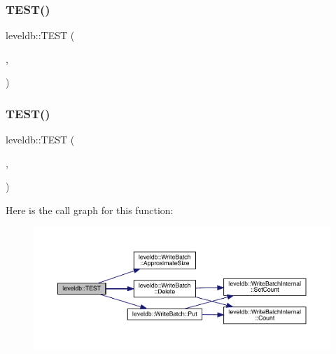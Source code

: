 \mbox{\label{namespaceleveldb_a404a4db88f6b45942b1945a996858a62}} 
\subsubsection{\texorpdfstring{TEST()}{TEST()}\hspace{0.1cm}{\footnotesize\ttfamily [17/102]}}
{\footnotesize\ttfamily leveldb\+::\+T\+E\+ST (\begin{DoxyParamCaption}\item[{\mbox{\hyperlink{classleveldb_1_1_auto_compact_test}{Auto\+Compact\+Test}}}]{,  }\item[{Read\+Half}]{ }\end{DoxyParamCaption})}

\mbox{\label{namespaceleveldb_a70983b6e32498fbc5014d7887125ad71}} 
\subsubsection{\texorpdfstring{TEST()}{TEST()}\hspace{0.1cm}{\footnotesize\ttfamily [18/102]}}
{\footnotesize\ttfamily leveldb\+::\+T\+E\+ST (\begin{DoxyParamCaption}\item[{\mbox{\hyperlink{classleveldb_1_1_write_batch_test}{Write\+Batch\+Test}}}]{,  }\item[{Approximate\+Size}]{ }\end{DoxyParamCaption})}

Here is the call graph for this function\+:
\nopagebreak
\begin{figure}[H]
\begin{center}
\leavevmode
\includegraphics[width=350pt]{namespaceleveldb_a70983b6e32498fbc5014d7887125ad71_cgraph}
\end{center}
\end{figure}
\mbox{\label{namespaceleveldb_ac9911f7a50cf3a0d5ddc4533910054a1}} 
